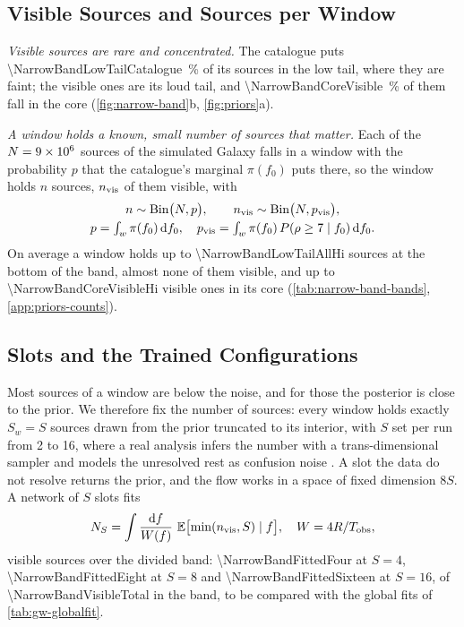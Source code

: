 \subsection{Visible Sources and Sources per Window}
\label{sec:gw-rates}\label{sec:narrow-band-prior}

\emph{Visible sources are rare and concentrated.} The catalogue puts
\qty{\NarrowBandLowTailCatalogue}{\percent} of its sources in the low tail, where they are faint;
the visible ones are its loud tail, and \qty{\NarrowBandCoreVisible}{\percent} of them fall in the
core (\cref{fig:narrow-band}b, \cref{fig:priors}a).

\emph{A window holds a known, small number of sources that matter.} Each of the
$N = \num{9e6}$ sources of the simulated Galaxy falls in a window with the probability
$p$ that the catalogue's marginal $\pi(f_0)$ puts there, so the window holds $n$ sources,
$n_{\rm vis}$ of them visible, with
\begin{equation}
\begin{gathered}
  n \sim \operatorname{Bin}\bigl(N, p\bigr),\qquad n_{\rm vis} \sim \operatorname{Bin}\bigl(N, p_{\rm vis}\bigr),\\
  p = \textstyle\int_{w} \pi(f_0)\,\mathrm{d} f_0,\quad p_{\rm vis} = \textstyle\int_{w} \pi(f_0)\,P(\rho\ge7\mid f_0)\,\mathrm{d} f_0.
\end{gathered}
  \label{eq:gw-rates}
\end{equation}
On average a window holds up to \num{\NarrowBandLowTailAllHi} sources at the bottom of the band,
almost none of them visible, and up to \num{\NarrowBandCoreVisibleHi} visible ones in its core
(\cref{tab:narrow-band-bands}, \cref{app:priors-counts}).

\subsection{Slots and the Trained Configurations}
\label{sec:narrow-band-bands}

Most sources of a window are below the noise, and for those the posterior is close to the prior. We
therefore fix the number of sources: every window holds exactly $S_w = S$ sources drawn from the
prior truncated to its interior, with $S$ set per run from 2 to 16, where a real analysis infers the
number with a trans-dimensional sampler \citep{littenberg2020global} and models the unresolved rest as
confusion noise \citep{karnesis2021characterization}. A slot the data do not resolve returns the
prior, and the flow works in a space of fixed dimension $8S$. A network of $S$ slots fits
\begin{equation}
  N_S = \int \frac{\dd f}{W(f)}\ \E\bigl[\min(n_{\rm vis},S)\mid f\bigr],\quad W = \ForwardModelWindowResponses{}R/\Tobs,
  \label{eq:narrow-band-fitted}
\end{equation}
visible sources over the divided band: \num{\NarrowBandFittedFour} at $S=4$,
\num{\NarrowBandFittedEight} at $S=8$ and \num{\NarrowBandFittedSixteen} at $S=16$, of
\num{\NarrowBandVisibleTotal} in the band, to be compared with the global fits of
\cref{tab:gw-globalfit}.

